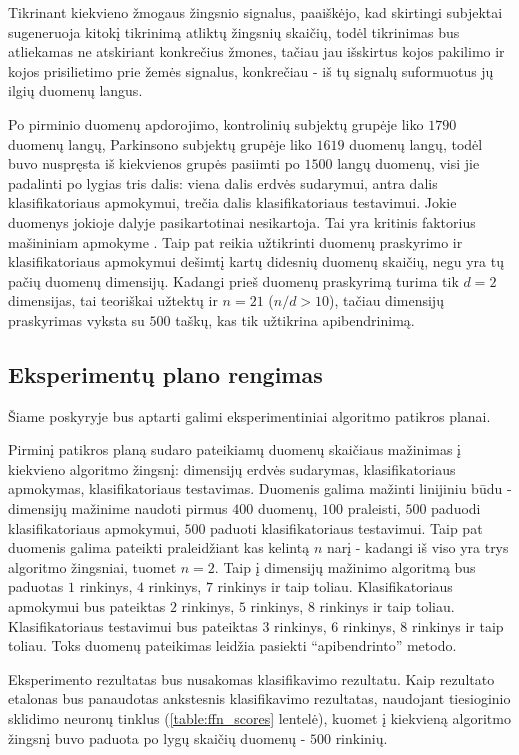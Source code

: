 \documentclass[]{vgtuef}
\begin{document}
Tikrinant kiekvieno žmogaus žingsnio signalus, paaiškėjo, kad skirtingi subjektai sugeneruoja kitokį tikrinimą atliktų žingsnių skaičių, todėl tikrinimas bus atliekamas ne atskiriant konkrečius žmones, tačiau jau išskirtus kojos pakilimo ir kojos prisilietimo prie žemės signalus, konkrečiau - iš tų signalų suformuotus jų ilgių duomenų langus.

Po pirminio duomenų apdorojimo, kontrolinių subjektų grupėje liko $1790$ duomenų langų, Parkinsono subjektų grupėje liko $1619$ duomenų langų, todėl buvo nuspręsta iš kiekvienos grupės pasiimti po $1500$ langų duomenų, visi jie padalinti po lygias tris dalis: viena dalis erdvės sudarymui, antra dalis klasifikatoriaus apmokymui, trečia dalis klasifikatoriaus testavimui. Jokie duomenys jokioje dalyje pasikartotinai nesikartoja. Tai yra kritinis faktorius mašininiam apmokyme \cite{824819}. Taip pat reikia užtikrinti duomenų praskyrimo ir klasifikatoriaus apmokymui dešimtį kartų didesnių duomenų skaičių, negu yra tų pačių duomenų dimensijų. Kadangi prieš duomenų praskyrimą turima tik $d=2$ dimensijas, tai teoriškai užtektų ir $n=21$ ($n/d > 10$), tačiau dimensijų praskyrimas vyksta su $500$ taškų, kas tik užtikrina apibendrinimą. 

\subsection{Eksperimentų plano rengimas}

Šiame poskyryje bus aptarti galimi eksperimentiniai algoritmo patikros planai.

Pirminį patikros planą sudaro pateikiamų duomenų skaičiaus mažinimas į kiekvieno algoritmo žingsnį: dimensijų erdvės sudarymas, klasifikatoriaus apmokymas, klasifikatoriaus testavimas. Duomenis galima mažinti linijiniu būdu - dimensijų mažinime naudoti pirmus $400$ duomenų, $100$ praleisti, $500$ paduodi klasifikatoriaus apmokymui, $500$ paduoti klasifikatoriaus testavimui. Taip pat duomenis galima pateikti praleidžiant kas kelintą $n$ narį - kadangi iš viso yra trys algoritmo žingsniai, tuomet $n=2$. Taip į dimensijų mažinimo algoritmą bus paduotas $1$ rinkinys, $4$ rinkinys, $7$ rinkinys ir taip toliau. Klasifikatoriaus apmokymui bus pateiktas $2$ rinkinys, $5$ rinkinys, $8$ rinkinys ir taip toliau. Klasifikatoriaus testavimui bus pateiktas $3$ rinkinys, $6$ rinkinys, $8$ rinkinys ir taip toliau. Toks duomenų pateikimas leidžia pasiekti ``apibendrinto'' metodo. 

Eksperimento rezultatas bus nusakomas klasifikavimo rezultatu. Kaip rezultato etalonas bus panaudotas ankstesnis klasifikavimo rezultatas, naudojant tiesioginio sklidimo neuronų tinklus (\ref{table:ffn_scores} lentelė), kuomet į kiekvieną algoritmo žingsnį buvo paduota po lygų skaičių duomenų - $500$ rinkinių.
\end{document}
